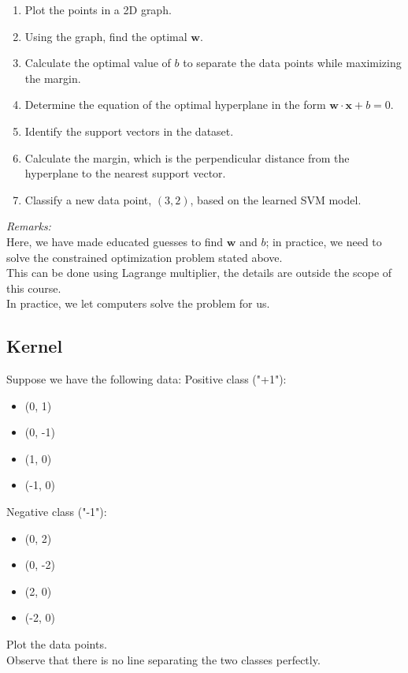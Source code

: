 \documentclass[]{article}
\begin{document}
	\begin{enumerate}
		\item Plot the points in a 2D graph.
		\item Using the graph, find the optimal $\mathbf{w}$.
		\item Calculate the optimal value of \(b\) to separate the data points while maximizing the margin.
		\item Determine the equation of the optimal hyperplane in the form \(\mathbf{w}\cdot\mathbf{x} + b = 0\).
		\item Identify the support vectors in the dataset.
		\item Calculate the margin, which is the perpendicular distance from the hyperplane to the nearest support vector.
		\item Classify a new data point, \((3, 2)\), based on the learned SVM model.
	\end{enumerate}
	\textit{Remarks:}\\
	Here, we have made educated guesses to find $\mathbf{w}$ and $b$; in practice, we need to solve the constrained optimization problem stated above.\\
	This can be done using Lagrange multiplier, the details are outside the scope of this course.\\
	In practice, we let computers solve the problem for us.
	
	
	
	\subsection{Kernel}
	Suppose we have the following data:
	Positive class ("+1"):
	\begin{itemize}
		\item (0, 1)
		\item (0, -1)
		\item (1, 0)
		\item (-1, 0)
	\end{itemize}
	Negative class ("-1"):
	\begin{itemize}
		\item (0, 2)
		\item (0, -2)
		\item (2, 0)
		\item (-2, 0)
	\end{itemize}
	Plot the data points.\\
	Observe that there is no line separating the two classes perfectly.
	
	\vspace{0.5cm}
	
\end{document}
